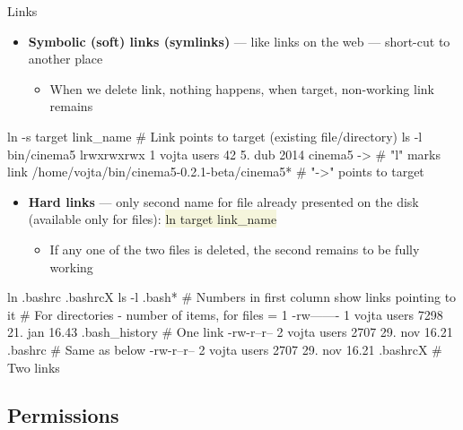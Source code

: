 \documentclass[compress, ucs, xelatex, 11pt, xcolor=svgnames, aspectratio=169,
	hyperref={
		bookmarks=true,
		unicode=true,
		colorlinks=true,
		pdftitle={Linux, command line and MetaCentrum},
		plainpages=false,
		pdfauthor={Vojtech Zeisek},
		pdfsubject={Course about use of Linux command line, writing shell scripts and using MetaCentrum of CESNET},
		pdfcreator={XeLaTeX},
		pdfkeywords={Linux, GNU, BASH, shell, command line, MetaCentrum},
		linkcolor=DarkRed, %
		anchorcolor=DarkBlue, %
		citecolor=Indigo, %
		filecolor=NavyBlue, %
		menucolor=DarkMagenta, %
		urlcolor=DarkBlue, %
		pdftex},
	url={hyphens, lowtilde} %
	]{beamer}
\renewcommand{\texttt}[1]{\colorbox{Beige}{{\ttfamily #1}}}
\begin{document}
\begin{frame}[fragile]{Links}
	\label{links}
	\begin{itemize}
		\item \textbf{Symbolic (soft) links (symlinks)} --- like links on the web --- short-cut to another place
		\begin{itemize}
			\item When we delete link, nothing happens, when target, non-working link remains
		\end{itemize}
	\end{itemize}
	\vfill
	\begin{bashcode}
    ln -s target link_name # Link points to target (existing file/directory)
    ls -l bin/cinema5
    lrwxrwxrwx 1 vojta users 42 5. dub 2014 cinema5 -> # "l" marks link
      /home/vojta/bin/cinema5-0.2.1-beta/cinema5*      # "->" points to target
	\end{bashcode}
	\vfill
	\begin{itemize}
		\item \textbf{Hard links} --- only second name for file already presented on the disk (available only for files): \texttt{ln target link\_name}
		\begin{itemize}
			\item If any one of the two files is deleted, the second remains to be fully working
		\end{itemize}
	\end{itemize}
	\vfill
	\begin{bashcode}
    ln .bashrc .bashrcX
    ls -l .bash* # Numbers in first column show links pointing to it
                 # For directories - number of items, for files = 1
    -rw------- 1 vojta users 7298 21. jan 16.43 .bash_history # One link
    -rw-r--r-- 2 vojta users 2707 29. nov 16.21 .bashrc       # Same as below
    -rw-r--r-- 2 vojta users 2707 29. nov 16.21 .bashrcX      # Two links
	\end{bashcode}
\end{frame}

\subsection{Permissions}
\end{document}
